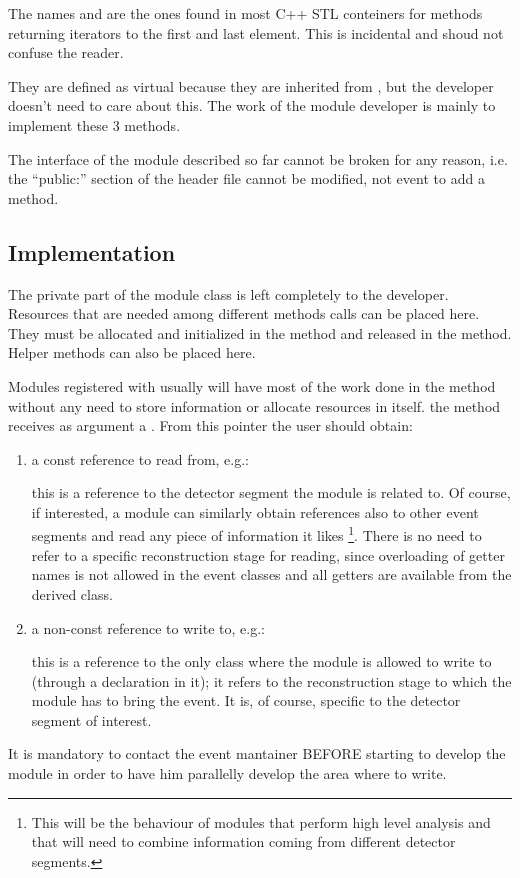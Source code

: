 The names  and  are the ones found in most C++ STL conteiners for methods returning iterators to the first and last element. 
This is incidental and shoud not confuse the reader.

They are defined as virtual because they are inherited from , but the developer doesn't need to care about this. 
The work of the module developer is mainly to implement these 3 methods.

The interface of the module described so far cannot be broken for any reason, i.e. the ``public:'' section of the header file cannot be modified, not event to add a method.


\subsection{Implementation}

The private part of the module class is left completely to the developer. Resources that are needed among different methods calls can be placed here. 
They must be allocated and initialized in the  method and released in the  method.
Helper methods can also be placed here. 

Modules registered with  usually will have most of the work done in the  method
without any need to store information or allocate resources in itself.
the  method receives as argument a .
From this pointer the user should obtain:
\begin{enumerate}
\item  a const reference to read from, e.g.:


  this is a reference to the detector segment the module is related to. 
  Of course, if interested, a module can similarly obtain references also to other event segments and read any piece of information it likes
  \footnote{This will be the behaviour of modules that perform high level analysis and that will need to combine information coming from different detector segments.}.
  There is no need to refer to a specific reconstruction stage for reading, 
  since overloading of getter names is not allowed in the event classes and all getters are available from the derived class.
\item a non-const reference to write to, e.g.:


  this is a reference to the only class where the module is allowed to write to (through a  declaration in it); 
  it refers to the reconstruction stage to which the module has to bring the event. 
  It is, of course, specific to the detector segment of interest.
\end{enumerate}
  It is mandatory to contact the event mantainer BEFORE starting to develop the module in order to have him parallelly develop the area where to write.

